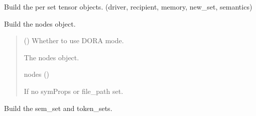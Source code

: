 \documentclass[letterpaper,10pt,english]{sphinxmanual}
\begin{document}
\begin{fulllineitems}
\begin{fulllineitems}
\label{\detokenize{nodes:nodes.nodeBuilder.nodeBuilder.build_node_tensors}}
\pysigstartsignatures
\pysiglinewithargsret
{}
{}
{}
\pysigstopsignatures
\sphinxAtStartPar
Build the per set tensor objects. (driver, recipient, memory, new\_set, semantics)

\end{fulllineitems}


\begin{fulllineitems}
\label{\detokenize{nodes:nodes.nodeBuilder.nodeBuilder.build_nodes}}
\pysigstartsignatures
\pysiglinewithargsret
{}
{}
{}
\pysigstopsignatures
\sphinxAtStartPar
Build the nodes object.
\begin{quote}\begin{description}
\sphinxAtStartPar
{} () \textendash{} Whether to use DORA mode.

\sphinxAtStartPar
The nodes object.

\sphinxAtStartPar
nodes ({\hyperref[\detokenize{nodes:nodes.nodes.Nodes}]{}})

\sphinxAtStartPar
{} \textendash{} If no symProps or file\_path set.

\end{description}\end{quote}

\end{fulllineitems}


\begin{fulllineitems}
\label{\detokenize{nodes:nodes.nodeBuilder.nodeBuilder.build_set_tensors}}
\pysigstartsignatures
\pysiglinewithargsret
{}
{}
{}
\pysigstopsignatures
\sphinxAtStartPar
Build the sem\_set and token\_sets.


\end{fulllineitems}
\end{fulllineitems}
\end{document}

